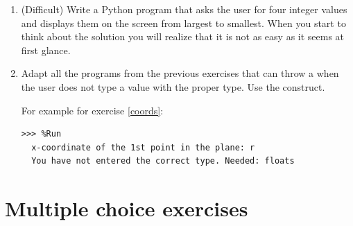\begin{enumerate}
\item (Difficult) Write a Python program that asks the user for four integer values and displays them on the screen from largest to smallest. When you start to think about the solution you will realize that it is not as easy as it seems at first glance.


\item Adapt all the programs from the previous exercises that can throw a  when the user does not type a value with the proper type. Use the  construct.

For example for exercise \ref{coords}:

\begin{Verbatim}[frame=single, label={\em example test execution of the program}]
>>> %Run 
  x-coordinate of the 1st point in the plane: r
  You have not entered the correct type. Needed: floats
\end{Verbatim}


\end{enumerate}


\section*{Multiple choice exercises}

